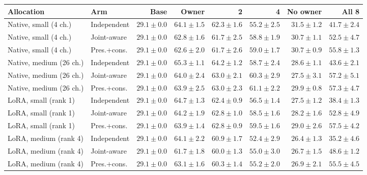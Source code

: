 \begin{tabular}{@{}llrrrrrr@{}}
\toprule
Allocation & Arm & Base & Owner & 2 & 4 & No owner & All 8\\
\midrule
Native, small (4 ch.) & Independent & $29.1 \pm 0.0$ & $64.1 \pm 1.5$ & $62.3 \pm 1.6$ & $55.2 \pm 2.5$ & $31.5 \pm 1.2$ & $41.7 \pm 2.4$\\
Native, small (4 ch.) & Joint-aware & $29.1 \pm 0.0$ & $62.8 \pm 1.6$ & $61.7 \pm 2.5$ & $58.8 \pm 1.9$ & $30.7 \pm 1.1$ & $52.5 \pm 4.7$\\
Native, small (4 ch.) & Pres.+cons. & $29.1 \pm 0.0$ & $62.6 \pm 2.0$ & $61.7 \pm 2.6$ & $59.0 \pm 1.7$ & $30.7 \pm 0.9$ & $55.8 \pm 1.3$\\
\midrule
Native, medium (26 ch.) & Independent & $29.1 \pm 0.0$ & $65.3 \pm 1.1$ & $64.2 \pm 1.2$ & $58.7 \pm 2.4$ & $28.6 \pm 1.1$ & $43.6 \pm 2.1$\\
Native, medium (26 ch.) & Joint-aware & $29.1 \pm 0.0$ & $64.0 \pm 2.4$ & $63.0 \pm 2.1$ & $60.3 \pm 2.9$ & $27.5 \pm 3.1$ & $57.2 \pm 5.1$\\
Native, medium (26 ch.) & Pres.+cons. & $29.1 \pm 0.0$ & $63.9 \pm 2.5$ & $63.0 \pm 2.3$ & $61.1 \pm 2.2$ & $29.9 \pm 0.8$ & $57.3 \pm 4.7$\\
\midrule
LoRA, small (rank 1) & Independent & $29.1 \pm 0.0$ & $64.7 \pm 1.3$ & $62.4 \pm 0.9$ & $56.5 \pm 1.4$ & $27.5 \pm 1.2$ & $38.4 \pm 1.3$\\
LoRA, small (rank 1) & Joint-aware & $29.1 \pm 0.0$ & $64.2 \pm 1.9$ & $62.8 \pm 1.0$ & $58.5 \pm 1.6$ & $28.2 \pm 1.6$ & $52.8 \pm 4.9$\\
LoRA, small (rank 1) & Pres.+cons. & $29.1 \pm 0.0$ & $63.9 \pm 1.4$ & $62.8 \pm 0.9$ & $59.5 \pm 1.6$ & $29.0 \pm 2.6$ & $57.5 \pm 4.2$\\
\midrule
LoRA, medium (rank 4) & Independent & $29.1 \pm 0.0$ & $64.1 \pm 2.2$ & $60.9 \pm 1.7$ & $52.4 \pm 2.9$ & $26.4 \pm 1.3$ & $35.2 \pm 4.6$\\
LoRA, medium (rank 4) & Joint-aware & $29.1 \pm 0.0$ & $61.7 \pm 1.8$ & $60.0 \pm 1.3$ & $55.0 \pm 3.0$ & $26.7 \pm 1.5$ & $48.6 \pm 1.2$\\
LoRA, medium (rank 4) & Pres.+cons. & $29.1 \pm 0.0$ & $63.1 \pm 1.6$ & $60.3 \pm 1.4$ & $55.2 \pm 2.0$ & $26.9 \pm 2.1$ & $55.5 \pm 4.5$\\
\bottomrule
\end{tabular}
